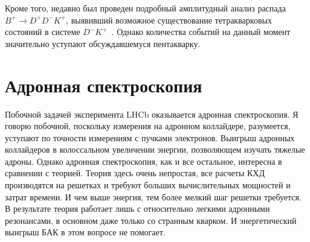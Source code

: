 \documentclass[a4paper, 10pt, twocolumn]{article}
\begin{document}
Кроме того, недавно был проведен подробный амплитудный анализ распада 
$B^+\to D^+ D^- K^+$, выявивший возможное существование тетракварковых 
состояний в системе $D^-K^+$~\cite{tetraquark}. Однако количества 
событий на данный момент значительно уступают обсуждавшемуся пентакварку.


\section{Адронная спектроскопия}

Побочной задачей эксперимента LHCb оказывается адронная спектроскопия. 
Я говорю побочной, поскольку измерения на адронном коллайдере, 
разумеется, уступают по точности измерениям с пучками электронов. 
Выигрыш адронных коллайдеров в колоссальном увеличении энергии, 
позволяющем изучать тяжелые адроны. Однако адронная спектроскопия, как 
и все остальное, интересна в сравнении с теорией. Теория здесь очень 
непростая, все расчеты КХД производятся на решетках и требуют больших 
вычислительных мощностей и затрат времени. И чем выше энергия, тем 
более мелкий шаг решетки требуется. В результате теория работает лишь 
с относительно легкими адронными резонансами, в основном даже только со 
странным кварком. И энергетический выигрыш БАК в этом вопросе не 
помогает.
\end{document}
